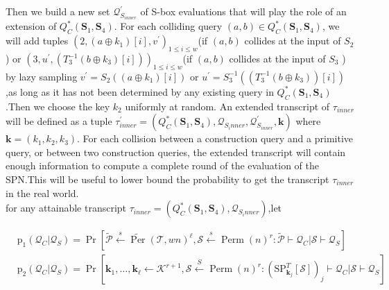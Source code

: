 Then we build a new set $\mathcal{Q}_{S_{inner}}^{\prime}$ of S-box evaluations that will play the role of an extension of $Q_{C}^{*}\left(\mathbf{S}_{1},\mathbf{S}_{4}\right)$. For each colliding query $(a, b) \in Q_{C}^{*}\left(\mathbf{S}_{1},\mathbf{S}_{4}\right)$, we will add tuples $\left(2, \left(a \oplus k_{1}\right)[i], v^{\prime}\right)_{1 \leq i \leq w}$(if $(a,b)$ collides at the input of $S_2$ ) or $\left(3, u^{\prime}, \left(T_{3}^{-1}\left(b \oplus k_{3}\right)[i]\right)\right)_{1 \leq i \leq w}$(if $(a,b)$ collides at the input of $S_3$ ) by lazy sampling $v^{\prime}=S_{2}(\left(a \oplus k_{1}\right)[i])$ or $u^{\prime}=S_{3}^{-1}(\left(T_{3}^{-1}\left(b \oplus k_{3}\right) \right)[i])$,as long as it has not been determined by any existing query in $Q_{C}^{*}\left(\mathbf{S}_{1},\mathbf{S}_{4}\right)$.Then we choose the key $k_2$ uniformly at random. An extended transcript of $\tau_{inner}$ will be defined as a tuple $\tau_{inner}^{\prime}=\left(Q_{C}^{*}\left(\mathbf{S}_{1},\mathbf{S}_{4}\right), \mathcal{Q}_{S_inner}, \mathcal{Q}_{S_{inner}}^{\prime}, \mathbf{k}\right)$ where $\mathbf{k}=\left(k_{1}, k_{2},k_{3}\right)$. For each collision between a construction query and a primitive query, or between two construction queries, the extended transcript will contain enough information to compute a complete round of the evaluation of the SPN.This will be useful to lower bound the probability to get the transcript $\tau_{inner}$ in the real world.\\

for any attainable transcript $\tau_{inner}=\left(Q_{C}^{*}\left(\mathbf{S}_{1},\mathbf{S}_{4}\right), \mathcal{Q}_{S_inner}\right)$,let

$$
\begin{aligned}
&\mathrm{p}_{1}\left(\mathcal{Q}_{C} | \mathcal{Q}_{S}\right)=\operatorname{Pr}\left[\widetilde{\mathcal{P}} \stackrel{s}{\leftarrow} \widetilde{\operatorname{Per}}(\mathcal{T}, w n)^{\ell}, \mathcal{S} \stackrel{s}{\leftarrow} \operatorname{Perm}(n)^{r}: \tilde{\mathcal{P}} \vdash \mathcal{Q}_{C} | \mathcal{S} \vdash \mathcal{Q}_{S}\right]\\
&\mathrm{p}_{2}\left(\mathcal{Q}_{C} | \mathcal{Q}_{S}\right)=\operatorname{Pr}\left[\mathbf{k}_{1}, \ldots, \mathbf{k}_{\ell} \leftarrow \mathcal{K}^{r+1}, \mathcal{S} \stackrel{S}{\leftarrow} \operatorname{Perm}(n)^{r}:\left(\mathrm{SP}_{\mathbf{k}_{j}}^{T}[\mathcal{S}]\right)_{j} \vdash \mathcal{Q}_{C} | \mathcal{S} \vdash \mathcal{Q}_{S}\right]
\end{aligned}
$$

